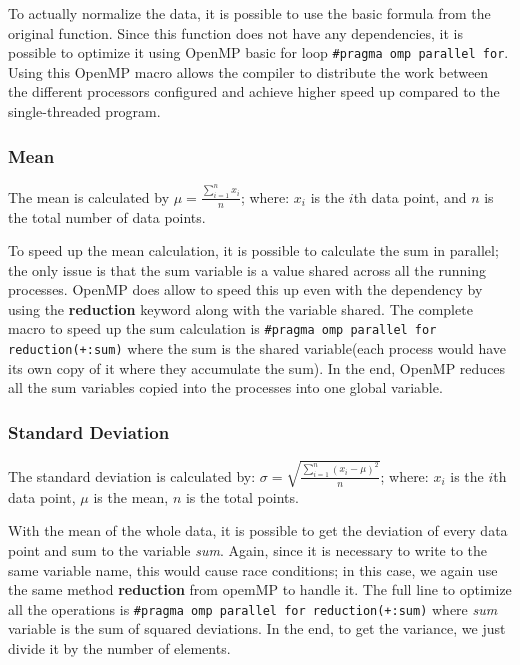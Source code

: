 \documentclass{article}
\begin{document}
To actually normalize the data, it is possible to use the basic formula from the original function. Since this function does not have any dependencies, it is possible to optimize it using OpenMP basic for loop \verb|#pragma omp parallel for|. Using this OpenMP macro allows the compiler to distribute the work between the different processors configured and achieve higher speed up compared to the single-threaded program. 






\subsubsection{Mean} \label{sec: mean}
The mean is calculated by  $\mu = \frac{\sum_{i=1}^{n} x_i}{n}$;
where: $x_i$ is the $i$th data point, and $n$ is the total number of data points. 


To speed up the mean calculation, it is possible to calculate the sum in parallel; the only issue is that the sum variable is a value shared across all the running processes. 
OpenMP does allow to speed this up even with the dependency by using the \textbf{reduction} keyword along with the variable shared. 
The complete macro to speed up the sum calculation is  \verb|#pragma omp parallel for reduction(+:sum)| where the sum is the shared variable(each process would have its own copy of it where they accumulate the sum). In the end, OpenMP reduces all the sum variables copied into the processes into one global variable.  


\subsubsection{Standard Deviation} \label{sec: std_dev}
The standard deviation is calculated by: $\sigma = \sqrt{\frac{\sum_{i=1}^{n} (x_i - \mu)^2}{n}}$; where: $x_i$ is the $i$th data point, $\mu$ is the mean, $n$ is the total points. 

With the mean of the whole data, it is possible to get the deviation of every data point and sum to the variable \textit{sum}. 
Again, since it is necessary to write to the same variable name, this would cause race conditions; in this case, we again use the same method \textbf{reduction} from opemMP to handle it. The full line to optimize all the operations is \verb|#pragma omp parallel for reduction(+:sum)| where \textit{sum} variable is the sum of squared deviations. In the end, to get the variance, we just divide it by the number of elements. 
\end{document}
